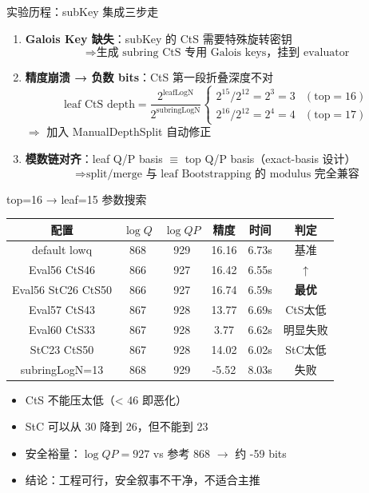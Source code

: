 \documentclass[aspectratio=169, 10pt, xcolor=svgnames, table, UTF8]{ctexbeamer}
\begin{document}
\begin{frame}{实验历程：subKey 集成三步走}
  \begin{enumerate}
    \item \textbf{Galois Key 缺失}：subKey 的 CtS 需要特殊旋转密钥
    \[
    \Longrightarrow \text{生成 subring CtS 专用 Galois keys，挂到 evaluator}
    \]
    
    \pause
    \item \textbf{精度崩溃 → 负数 bits}：CtS 第一段折叠深度不对
    \[
    \text{leaf CtS depth} = \frac{2^{\mathrm{leafLogN}}}{2^{\mathrm{subringLogN}}}
    \begin{cases}
      2^{15}/2^{12} = 2^3 = 3 & (\text{top}=16)\\
      2^{16}/2^{12} = 2^4 = 4 & (\text{top}=17)
    \end{cases}
    \]
    \(\Longrightarrow\) 加入 ManualDepthSplit 自动修正
    
    \pause
    \item \textbf{模数链对齐}：leaf Q/P basis \(\equiv\) top Q/P basis（exact-basis 设计）
    \[
    \Longrightarrow \text{split/merge 与 leaf Bootstrapping 的 modulus 完全兼容}
    \]
  \end{enumerate}
\end{frame}

\begin{frame}{top=16 → leaf=15 参数搜索}
  \begin{center}
    \small
    \begin{tabular}{@{}cccccc@{}}
      \toprule
      配置 & \(\log Q\) & \(\log QP\) & 精度 & 时间 & 判定 \\
      \midrule
      default lowq & 868 & 929 & 16.16 & 6.73s & 基准 \\
      Eval56 CtS46 & 866 & 927 & \alert{16.42} & 6.55s & \(\uparrow\) \\
      \alert{Eval56 StC26 CtS50} & 866 & 927 & \alert{16.74} & 6.59s & \textbf{最优} \\
      Eval57 CtS43 & 867 & 928 & 13.77 & 6.69s & CtS太低 \\
      Eval60 CtS33 & 867 & 928 & 3.77 & 6.62s & 明显失败 \\
      StC23 CtS50 & 867 & 928 & 14.02 & 6.02s & StC太低 \\
      subringLogN=13 & 868 & 929 & -5.52 & 8.03s & 失败 \\
      \bottomrule
    \end{tabular}
  \end{center}
  
  \pause
  
  \begin{itemize}
    \item CtS 不能压太低（< 46 即恶化）
    \item StC 可以从 30 降到 26，但不能到 23
    \item 安全裕量：\(\log QP = 927\) vs 参考 868 \(\rightarrow\) \alert{约 -59 bits}
    \item 结论：工程可行，安全叙事不干净，不适合主推
  \end{itemize}
\end{frame}
\end{document}
